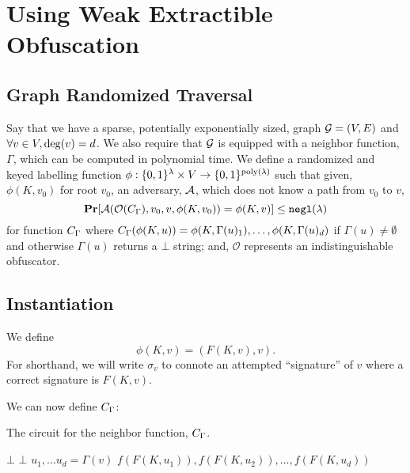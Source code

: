 \newcommand{\labelFunc}{\phi}
\newcommand{\imageFn}{\text{Image}}
\newcommand{\pathSuffix}{\text{Suff}}

\section{Using Weak Extractible Obfuscation}

\subsection{Graph Randomized Traversal}
Say that we have a sparse, potentially exponentially sized, graph $\mathcal{G} = (V, E)$
and $\forall v \in V, \deg(v) = d$.
We also require that $\mathcal{G}$ is equipped with a neighbor function, $\Gamma$, which can be computed in polynomial time.
We define a randomized and keyed labelling function $\phi: \{0,1\}^\lambda \times V \rightarrow \{0,1\}^{\operatorname{poly}(\lambda)}$ 
such that given, $\phi(K, v_0)$ for root $v_0$, an adversary, $\mathcal{A}$, which does not know a path from $v_0$ to $v$,
\begin{equation}
	\label{eq:guessPhi}
	\Pr[\advers(\mathcal{O}(\circNeigb), v_0, v, \labelFunc(K, v_0)) = \labelFunc(K, v)] \leq \negl(\lambda)
\end{equation}
for function $C_\Gamma$ where $\circNeigb(\labelFunc(K, u)) = \labelFunc(K, \Gamma(u)_1), \dots, \labelFunc(K, \Gamma(u)_d)$
if $\Gamma(u) \neq \emptyset$ and otherwise $\Gamma(u)$ returns a $\bot$ string;
and, $\mathcal{O}$ represents an indistinguishable obfuscator.

\subsection{Instantiation}
We define 
\begin{equation*}
	\labelFunc(K, v) = (F(K, v), v).
\end{equation*}
For shorthand, we will write $\sigma_v$ to connote an attempted ``signature'' of $v$
where a correct signature is $F(K, v)$.

We can now define $C_\Gamma$:
\begin{algorithm}[H]
	\caption{
		The circuit for the neighbor function, $C_\Gamma$.
	}
	\begin{algorithmic}[1]
				\State \Return $\bot$
			\EndIf
				\State \Return $\bot$
			\EndIf
			\State $u_1, \dots u_d = \Gamma(v)$
			\State \Return $f(F(K, u_1)), f(F(K, u_2)), \dots, f(F(K, u_d))$
		\EndFunction
	\end{algorithmic}
	\label{alg:neighb}
\end{algorithm}

